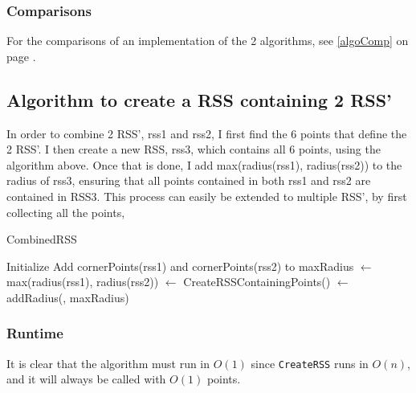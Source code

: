 \subsubsection{Comparisons}
For the comparisons of an implementation of the 2 algorithms, see \ref{algoComp} on page \pageref{algoComp}.

\subsection{Algorithm to create a RSS containing 2 RSS'}
In order to combine  2 RSS', rss1 and rss2, I first find the 6 points that define the 2 RSS'. I then create a new RSS, rss3, which contains all 6 points, using the algorithm above. Once that is done, I add  max(radius(rss1), radius(rss2)) to the radius of rss3, ensuring that all points contained in both rss1 and rss2 are contained in RSS3. This process can easily be extended to multiple RSS', by first collecting all the points, 

\begin{algorithm}[H]
  \caption{CombinedRSS}
   
  \dontprintsemicolon
  Initialize \points \;
  Add cornerPoints(rss1) and cornerPoints(rss2) to \points \;
  maxRadius $\gets$ max(radius(rss1), radius(rss2)) \;
  \crss $\gets$ CreateRSSContainingPoints(\points) \;
  \crss $\gets$ addRadius(\crss, maxRadius) \;
  \return \crss
\end{algorithm}

\subsubsection{Runtime}
It is clear that the algorithm must run in $O(1)$ since \texttt{CreateRSS} runs in $O(n)$, and it will always be called with $O(1)$ points.

